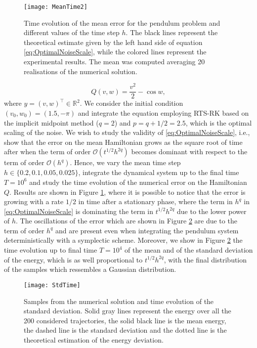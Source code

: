 \documentclass{siamart1116}
\numberwithin{theorem}{section}
\newcommand{\R}{\mathbb{R}}
\newcommand{\OO}{\mathcal{O}}
\begin{document}
\begin{figure}[t]
	\centering
	\texttt{[image: MeanTime2]}
	\caption{Time evolution of the mean error for the pendulum problem and different values of the time step $h$. The black lines represent the theoretical estimate given by the left hand side of equation \eqref{eq:OptimalNoiseScale}, while the colored lines represent the experimental results. The mean was computed averaging 20 realisations of the numerical solution.}
	\label{fig:MeanTime}	
\end{figure}
\begin{equation}
	Q(v, w) = \frac{v^2}{2} - \cos w,
\end{equation}
where $y = (v, w)^\top \in \R^2$. We consider the initial condition $(v_0, w_0) = (1.5, -\pi)$ and integrate the equation employing RTS-RK based on the implicit midpoint method ($q = 2$) and $p = q + 1/2 = 2.5$, which is the optimal scaling of the noise. We wish to study the validity of \eqref{eq:OptimalNoiseScale}, i.e., show that the error on the mean Hamiltonian grows as the square root of time after when the term of order $\OO(t^{1/2}h^{2q})$ becomes dominant with respect to the term of order $\OO(h^q)$. Hence, we vary the mean time step $h \in \{0.2, 0.1, 0.05, 0.025\}$, integrate the dynamical system up to the final time $T = 10^6$ and study the time evolution of the numerical error on the Hamiltonian $Q$. Results are shown in Figure \ref{fig:MeanTime}, where it is possible to notice that the error is growing with a rate $1/2$ in time after a stationary phase, where the term in $h^q$ in \eqref{eq:OptimalNoiseScale} is dominating the term in $t^{1/2}h^{2q}$ due to the lower power of $h$. The oscillations of the error which are shown in Figure \ref{fig:StdTime} are due to the term of order $h^q$ and are present even when integrating the pendulum system deterministically with a symplectic scheme. Moreover, we show in Figure \ref{fig:StdTime} the time evolution up to final time $T = 10^4$ of the mean and of the standard deviation of the energy, which is as well proportional to $t^{1/2}h^{2q}$, with the final distribution of the samples which ressembles a Gaussian distribution.

\begin{figure}[t]
	\centering
	\texttt{[image: StdTime]}
	\caption{Samples from the numerical solution and time evolution of the standard deviation. Solid gray lines represent the energy over all the 200 considered trajectories, the solid black line is the mean energy, the dashed line is the standard deviation and the dotted line is the theoretical estimation of the energy deviation.}
	\label{fig:StdTime}	
\end{figure}
\end{document}
